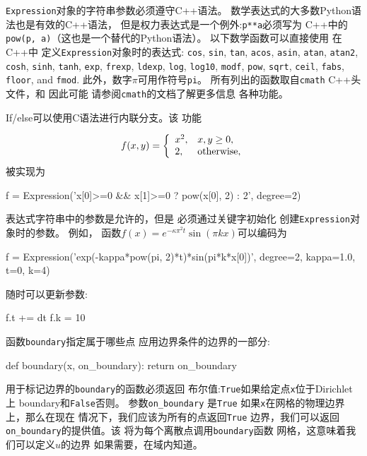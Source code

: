
\begin{notice}[字符串表达式必须具有有效的C++语法!]
\texttt{Expression}对象的字符串参数必须遵守C++语法。
数学表达式的大多数Python语法也是有效的C++语法，
但是权力表达式是一个例外:\texttt{p**a}必须写为
C++中的\texttt{pow(p, a)}（这也是一个替代的Python语法）。
以下数学函数可以直接使用
在C++中
定义\texttt{Expression}对象时的表达式:
\texttt{cos}, \texttt{sin}, \texttt{tan}, \texttt{acos}, \texttt{asin},
\texttt{atan}, \texttt{atan2}, \texttt{cosh}, \texttt{sinh}, \texttt{tanh}, \texttt{exp},
\texttt{frexp}, \texttt{ldexp}, \texttt{log}, \texttt{log10}, \texttt{modf},
\texttt{pow}, \texttt{sqrt}, \texttt{ceil}, \texttt{fabs}, \texttt{floor}, and \texttt{fmod}.
此外，数字$\pi$可用作符号\texttt{pi}。
所有列出的函数取自\texttt{cmath} C++头文件，和
因此可能
请参阅\texttt{cmath}的文档了解更多信息
各种功能。

If/else可以使用C语法进行内联分支。该
功能

\[ f(x,y) = \left\lbrace\begin{array}{ll} x^2, & x, y\geq 0,\\
2, & \hbox{otherwise},\end{array}\right.\]
被实现为

\begin{python}
f = Expression('x[0]>=0 && x[1]>=0 ? pow(x[0], 2) : 2', degree=2)
\end{python}

表达式字符串中的参数是允许的，但是
必须通过关键字初始化
创建\texttt{Expression}对象时的参数。 例如，
函数$f(x)=e^{-\kappa\pi^2t}\sin(\pi k x)$可以编码为

\begin{python}
f = Expression('exp(-kappa*pow(pi, 2)*t)*sin(pi*k*x[0])', degree=2,
               kappa=1.0, t=0, k=4)
\end{python}
随时可以更新参数:

\begin{python}
f.t += dt
f.k = 10
\end{python}
\end{notice}


函数\texttt{boundary}指定属于哪些点
应用边界条件的边界的一部分:

\begin{python}
def boundary(x, on_boundary):
    return on_boundary
\end{python}
用于标记边界的\texttt{boundary}的函数必须返回
布尔值:\texttt{True}如果给定点\texttt{x}位于Dirichlet上
boundary和\texttt{False}否则。 参数\verb!on_boundary! 是\texttt{True}
如果\texttt{x}在网格的物理边界上，那么在现在
情况下，我们应该为所有的点返回\texttt{True}
边界，我们可以返回\verb!on_boundary!的提供值。该
将为每个离散点调用\texttt{boundary}函数
网格，这意味着我们可以定义$u$的边界
如果需要，在域内知道。

